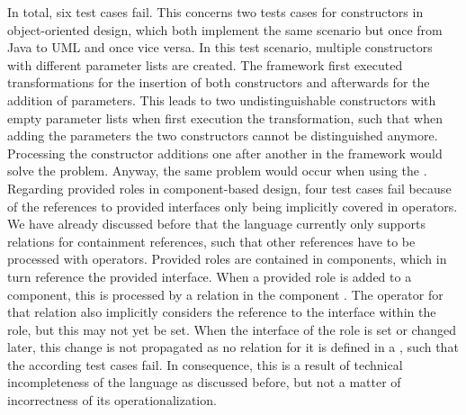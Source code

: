 In total, six test cases fail.
This concerns two tests cases for constructors in object-oriented design, which both implement the same scenario but once from Java to \gls{UML} and once vice versa.
In this test scenario, multiple constructors with different parameter lists are created.
The \vitruv framework first executed transformations for the insertion of both constructors and afterwards for the addition of parameters.
This leads to two undistinguishable constructors with empty parameter lists when first execution the transformation, such that when adding the parameters the two constructors cannot be distinguished anymore.
Processing the constructor additions one after another in the framework would solve the problem.
Anyway, the same problem would occur when using the \reactionslanguage.
Regarding provided roles in component-based design, four test cases fail because of the references to provided interfaces only being implicitly covered in operators.
We have already discussed before that the \commonalities language currently only supports relations for containment references, such that other references have to be processed with operators.
Provided roles are contained in components, which in turn reference the provided interface.
When a provided role is added to a component, this is processed by a relation in the component \commonality.
The operator for that relation also implicitly considers the reference to the interface within the role, but this may not yet be set.
When the interface of the role is set or changed later, this change is not propagated as no relation for it is defined in a \commonality, such that the according test cases fail.
In consequence, this is a result of technical incompleteness of the \commonalities language as discussed before, but not a matter of incorrectness of its operationalization.




